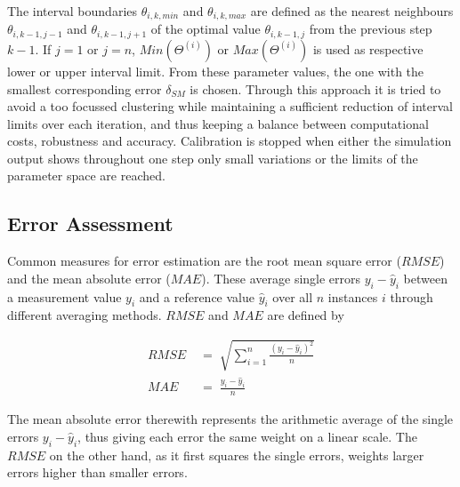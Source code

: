 \noindent The interval boundaries $\theta_{i,k,min}$ and $\theta_{i,k,max}$ are defined as the nearest neighbours $\theta_{i,k-1,j-1}$ and $\theta_{i,k-1,j+1}$ of the optimal value $\theta_{i,k-1,j}$ from the previous step $k-1$. 
If $j=1$ or $j=n$, $Min(\Theta^{(i)})$ or $Max(\Theta^{(i)})$ is used as respective lower or upper interval limit. 
From these parameter values, the one with the smallest corresponding error $\delta_{SM}$ is chosen. 
Through this approach it is tried to avoid a too focussed clustering while maintaining a sufficient reduction of interval limits over each iteration, and thus keeping a balance between computational costs, robustness and accuracy. 
Calibration is stopped when either the simulation output shows throughout one step only small variations or the limits of the parameter space are reached.

\subsection{Error Assessment}
\label{Sec-SubMethErrAss}

Common measures for error estimation are the root mean square error ($RMSE$) and the mean absolute error ($MAE$). 
These average single errors $y_i - \hat{y}_i$ between a measurement value $y_i$ and a reference value $\hat{y}_i$ over all $n$ instances $i$ through different averaging methods. 
$RMSE$ and $MAE$ are defined by

\begin{align}
    RMSE \; & = \; \sqrt{ \sum_{i=1}^{n} \frac{(y_i - \hat{y}_i)^2}{n} } \label{Eq-RMSE}\\
    MAE \; & = \; \frac{y_i - \hat{y}_i }{n} \label{MAE}
\end{align}


\noindent The mean absolute error therewith represents the arithmetic average of the single errors $y_i-\hat{y}_i$, thus giving each error the same weight on a linear scale. 
The $RMSE$ on the other hand, as it first squares the single errors, weights larger errors higher than smaller errors.

